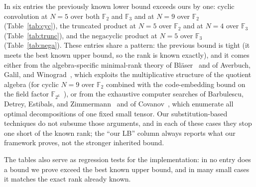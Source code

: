 \documentclass[11pt]{article}
\theoremstyle{definition}
\newcommand{\F}{\mathbb{F}}
\begin{document}
In six entries the previously known lower bound exceeds ours by one: cyclic
convolution at $N=5$ over both $\F_2$ and $\F_3$ and at $N=9$ over $\F_2$
(Table~\ref{tab:cyc}), the truncated product at $N=5$ over $\F_2$ and at $N=4$
over $\F_3$ (Table~\ref{tab:trunc}), and the negacyclic product at $N=5$ over
$\F_3$ (Table~\ref{tab:nega}). These entries share a pattern: the previous bound
is tight (it meets the best known upper bound, so the rank is known exactly), and
it comes either from the algebra-specific minimal-rank theory of
Bl\"aser~\cite{blaser2005complete} and of Averbuch, Galil, and
Winograd~\cite{averbuch1991classification}, which exploits the multiplicative
structure of the quotient algebra (for cyclic $N=9$ over $\F_2$ combined with
the code-embedding bound on the field factor $\F_{2^6}$~\cite{lempel1977new,grassl2007codetables}),
or from the exhaustive
computer searches of
Barbulescu, Detrey, Estibals, and Zimmermann~\cite{barbulescu2012finding} and of
Covanov~\cite{covanov2019improved}, which enumerate all optimal decompositions of
one fixed small tensor. Our
substitution-based techniques do not subsume those arguments, and in each of these
cases they stop one short of the known rank; the ``our LB'' column always reports
what our framework proves, not the stronger inherited bound.

The tables also serve as regression tests for the implementation: in no entry does a
bound we prove exceed the best known upper bound, and in many small cases it matches
the exact rank already known.
\end{document}
